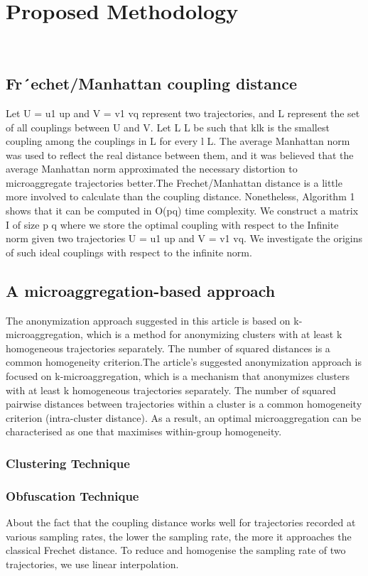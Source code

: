 \section{Proposed Methodology}~\label{sec:design}
\subsection{Fr´echet/Manhattan coupling distance}
Let U = u1 up and V = v1 vq represent two trajectories, and L represent the set of all couplings between U and V. Let L L be such that klk is the smallest coupling among the couplings in L for every l L. The average Manhattan norm was used to reflect the real distance between them, and it was believed that the average Manhattan norm approximated the necessary distortion to microaggregate trajectories better.The Frechet/Manhattan distance is a little more involved to calculate than the coupling distance. Nonetheless, Algorithm 1 shows that it can be computed in O(pq) time complexity. We construct a matrix I of size p q where we store the optimal coupling with respect to the Infinite norm given two trajectories U = u1 up and V = v1 vq. We investigate the origins of such ideal couplings with respect to the infinite norm.
\subsection{A microaggregation-based approach}

The anonymization approach suggested in this article is based on k-microaggregation, which is a method for anonymizing clusters with at least k homogeneous trajectories separately. The number of squared distances is a common homogeneity criterion.The article's suggested anonymization approach is focused on k-microaggregation, which is a mechanism that anonymizes clusters with at least k homogeneous trajectories separately. The number of squared pairwise distances between trajectories within a cluster is a common homogeneity criterion (intra-cluster distance).
As a result, an optimal microaggregation can be characterised as one that maximises within-group homogeneity.
\subsubsection{Clustering Technique}

\subsubsection{Obfuscation Technique}
About the fact that the coupling distance works well for trajectories recorded at various sampling rates, the lower the sampling rate, the more it approaches the classical Frechet distance. To reduce and homogenise the sampling rate of two trajectories, we use linear interpolation.